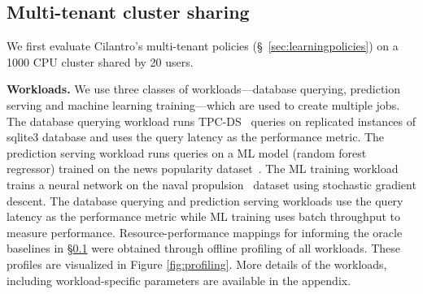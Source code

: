 
\subsection{Multi-tenant cluster sharing}
\label{sec:fixedclus}


We first evaluate Cilantro's multi-tenant policies (\S~\ref{sec:learningpolicies}) on a 1000 CPU
cluster shared by 20 users.


\textbf{Workloads.}
We use three classes of workloads---database querying, prediction serving and
machine learning training---which are used to create multiple jobs. The database querying workload runs TPC-DS~\cite{tpc-ds} 
queries on replicated instances of sqlite3 database and uses the query latency as the performance metric. 
The prediction serving workload runs queries on a ML model (random forest regressor) trained on the news popularity dataset~\cite{fernandes2015proactive}. 
The ML training workload trains a neural network on the naval propulsion~\cite{coraddu2016machine} dataset using stochastic gradient descent. The database querying and prediction serving workloads use the query latency as the performance metric while ML training uses batch throughput to measure performance. Resource-performance mappings for informing the oracle baselines in \S\ref{sec:fixedclus} were obtained through offline profiling of all workloads. These profiles are visualized in Figure \ref{fig:profiling}. 
More details of the workloads, including workload-specific parameters are available in the appendix.




